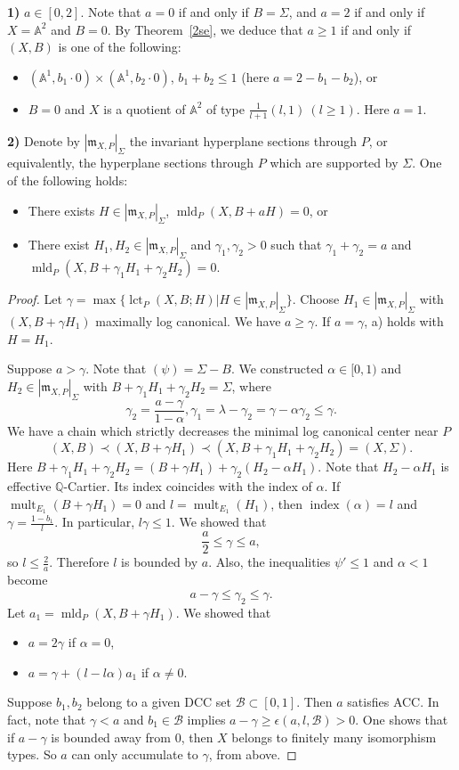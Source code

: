 \documentclass[12pt,reqno]{amsart}
\newcommand{\Q}{{\mathbb Q}}
\newcommand{\bA}{{\mathbb A}} %
\newcommand{\fm}{{\mathfrak m}} %
\newcommand{\cB}{{\mathcal B}}
\newcommand{\ind}{\operatorname{index}}
\newcommand{\lct}{\operatorname{lct}}
\newcommand{\mld}{\operatorname{mld}}
\newcommand{\mult}{\operatorname{mult}}
\theoremstyle{plain}
\theoremstyle{definition}
\theoremstyle{remark}
\begin{document}
{\bf 1)} $a\in [0,2]$. Note that $a=0$ if and only if $B=\Sigma$, 
and $a=2$ if and only if $X=\bA^2$ and $B=0$. By Theorem~\ref{2se},
we deduce that $a\ge 1$ if and only if $(X,B)$ is one of the following:
\begin{itemize}
\item $(\bA^1,b_1\cdot 0)\times (\bA^1,b_2\cdot 0)$,
$b_1+b_2\le 1$ (here $a=2-b_1-b_2$), or
\item $B=0$ and $X$ is a quotient of $\bA^2$ of type $\frac{1}{l+1}(l,1) \ (l\ge 1)$. Here $a=1$.
\end{itemize}

{\bf 2)} Denote by $|\fm_{X,P}|_\Sigma$ the invariant hyperplane sections through $P$, or equivalently, the hyperplane sections through $P$ which are supported by $\Sigma$. One of the following holds:
\begin{itemize}
\item[a)] There exists $H\in |\fm_{X,P}|_\Sigma$, $\mld_P(X,B+aH)=0$, or
\item[b)] There exist $H_1,H_2\in |\fm_{X,P}|_\Sigma$ and $\gamma_1,\gamma_2>0$ such that $\gamma_1+\gamma_2=a$ and $\mld_P(X,B+\gamma_1H_1+\gamma_2H_2)=0$.
\end{itemize}

\begin{proof}
Let $\gamma=\max\{\lct_P(X,B;H) \vert H\in |\fm_{X,P}|_\Sigma\}$. Choose
$H_1\in |\fm_{X,P}|_\Sigma$ with $(X,B+\gamma H_1)$ maximally log canonical.
We have $a\ge \gamma$. If $a=\gamma$, a) holds with $H=H_1$.

Suppose $a>\gamma$. Note that $(\psi)=\Sigma-B$. 
We constructed $\alpha\in [0,1)$ and 
$H_2\in |\fm_{X,P}|_\Sigma$  
with $B+\gamma_1H_1+\gamma_2H_2=\Sigma$, where 
$$
\gamma_2=\frac{a-\gamma}{1-\alpha}, \gamma_1=\lambda-\gamma_2=
\gamma-\alpha \gamma_2\le \gamma.
$$
We have a chain which strictly decreases the minimal log canonical
center near $P$
$$
(X,B)\prec (X,B+\gamma H_1)\prec (X,B+\gamma_1 H_1+\gamma_2H_2)=(X,\Sigma).
$$
Here $B+\gamma_1 H_1+\gamma_2H_2=(B+\gamma H_1)+\gamma_2(H_2-\alpha H_1)$.
Note that $H_2-\alpha H_1$ is effective $\Q$-Cartier. Its index coincides
with the index of $\alpha$. If $\mult_{E_1}(B+\gamma H_1)=0$ and 
$l=\mult_{E_1}(H_1)$, then $\ind(\alpha)=l$ and $\gamma=\frac{1-b_1}{l}$.
In particular, $l\gamma\le 1$. We showed that 
$$
\frac{a}{2}\le \gamma\le a,
$$
so $l\le \frac{2}{a}$. Therefore $l$ is bounded by $a$.
Also, the inequalities $\psi'\le 1$ and $\alpha<1$ become
$$
a-\gamma\le \gamma_2\le \gamma.
$$
Let $a_1=\mld_P(X,B+\gamma H_1)$. We showed that
\begin{itemize}
\item $a=2\gamma$ if $\alpha=0$,
\item $a=\gamma+(l-l\alpha)a_1$ if $\alpha\ne 0$.
\end{itemize}

Suppose $b_1,b_2$ belong to a given DCC set $\cB\subset [0,1]$.
Then $a$ satisfies ACC. In fact, note that $\gamma<a$ and $b_1\in\cB$ implies
$a-\gamma\ge \epsilon(a,l,\cB)>0$. One shows that if $a-\gamma$ is bounded away from $0$, 
then $X$ belongs to finitely many isomorphism types. So
$a$ can only accumulate to $\gamma$, from above.
\end{proof}
\end{document}
